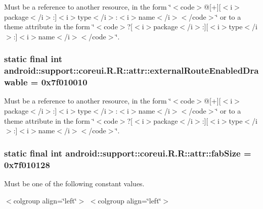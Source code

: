 Must be a reference to another resource, in the form \char`\"{}$<$code$>$@\mbox{[}+\mbox{]}\mbox{[}$<$i$>$package$<$/i$>$:\mbox{]}$<$i$>$type$<$/i$>$:$<$i$>$name$<$/i$>$$<$/code$>$\char`\"{} or to a theme attribute in the form \char`\"{}$<$code$>$?\mbox{[}$<$i$>$package$<$/i$>$:\mbox{]}\mbox{[}$<$i$>$type$<$/i$>$:\mbox{]}$<$i$>$name$<$/i$>$$<$/code$>$\char`\"{}. \hypertarget{classandroid_1_1support_1_1coreui_1_1_r_1_1attr_7f0fc01ee6aa047c2a699c9f2c4a4cf0}{
\subsubsection[{externalRouteEnabledDrawable}]{\setlength{\rightskip}{0pt plus 5cm}static final int android::support::coreui.R.R::attr::externalRouteEnabledDrawable = 0x7f010010}}
\label{classandroid_1_1support_1_1coreui_1_1_r_1_1attr_7f0fc01ee6aa047c2a699c9f2c4a4cf0}


Must be a reference to another resource, in the form \char`\"{}$<$code$>$@\mbox{[}+\mbox{]}\mbox{[}$<$i$>$package$<$/i$>$:\mbox{]}$<$i$>$type$<$/i$>$:$<$i$>$name$<$/i$>$$<$/code$>$\char`\"{} or to a theme attribute in the form \char`\"{}$<$code$>$?\mbox{[}$<$i$>$package$<$/i$>$:\mbox{]}\mbox{[}$<$i$>$type$<$/i$>$:\mbox{]}$<$i$>$name$<$/i$>$$<$/code$>$\char`\"{}. \hypertarget{classandroid_1_1support_1_1coreui_1_1_r_1_1attr_9977cf6dc79de473a47d3a07ea6c2d6e}{
\subsubsection[{fabSize}]{\setlength{\rightskip}{0pt plus 5cm}static final int android::support::coreui.R.R::attr::fabSize = 0x7f010128}}
\label{classandroid_1_1support_1_1coreui_1_1_r_1_1attr_9977cf6dc79de473a47d3a07ea6c2d6e}


Must be one of the following constant values. \begin{TabularC}{0}
\hline
\end{TabularC}
$<$colgroup align=\char`\"{}left\char`\"{}$>$ $<$colgroup align=\char`\"{}left\char`\"{}$>$ 

